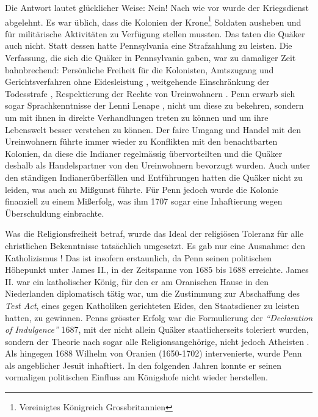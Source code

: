 Die Antwort lautet glücklicher Weise: Nein! Nach wie vor wurde der Kriegsdienst
abgelehnt. Es war üblich, dass die Kolonien der Krone\footnote{Vereinigtes
Königreich Grossbritannien} Soldaten ausheben und für militärische
Aktivitäten zu Verfügung stellen mussten. Das taten die Quäker auch nicht. Statt
dessen hatte Pennsylvania eine Strafzahlung zu leisten. Die Verfassung, die sich
die Quäker in Pennsylvania gaben, war zu damaliger Zeit bahnbrechend: Persönliche
Freiheit für die Kolonisten, Amtszugang und Gerichtsverfahren ohne
Eidesleistung , weitgehende Einschränkung der Todesstrafe
, Respektierung der Rechte von Ureinwohnern
. Penn erwarb sich sogar Sprachkenntnisse
 der Lenni Lenape , nicht
um diese zu bekehren, sondern um mit ihnen in direkte Verhandlungen treten zu
können und um ihre Lebenswelt besser verstehen zu können. Der faire Umgang und
Handel mit den Ureinwohnern führte immer wieder zu Konflikten mit den
benachtbarten Kolonien, da diese die Indianer regelmässig übervorteilten und
die Quäker deshalb als Handelspartner von den Ureinwohnern bevorzugt wurden.
Auch unter den ständigen Indianerüberfällen und Entführungen
hatten die Quäker nicht zu leiden, was auch zu Mißgunst führte. Für Penn jedoch
wurde die Kolonie finanziell zu einem Mißerfolg, was ihm 1707 sogar eine
Inhaftierung  wegen Überschuldung einbrachte.

\medskip

Was die Religionsfreiheit betraf, wurde das Ideal der religiösen Toleranz für
alle
christlichen Bekenntnisse tatsächlich umgesetzt. Es gab nur eine Ausnahme: den
Katholizismus ! Das ist insofern erstaunlich, da Penn
seinen politischen Höhepunkt unter James II.,
 in der Zeitspanne von 1685 bis 1688 erreichte. James II. war ein
katholischer König, für den er am Oranischen Hause in
den Niederlanden
 diplomatisch tätig war, um die Zustimmung zur
Abschaffung des \textit{Test Act}, eines gegen Katholiken gerichteten Eides, 
den Staatsdiener zu leisten hatten, zu gewinnen. Penns grösster
Erfolg war die Formulierung
der \textit{"`Declaration of Indulgence"'} 1687, mit der nicht allein Quäker
staatlicherseits toleriert wurden, sondern der Theorie nach sogar alle
Religionsangehörige, nicht jedoch Atheisten . Als
hingegen 1688 Wilhelm von Oranien (1650-1702)  intervenierte, wurde Penn als angeblicher
Jesuit inhaftiert. In den folgenden Jahren konnte er
seinen vormaligen politischen Einfluss am Königshofe  nicht
wieder herstellen.




